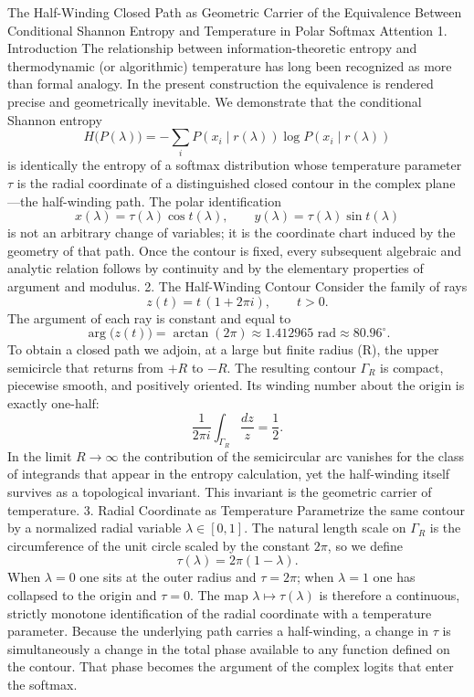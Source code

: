 The Half-Winding Closed Path as Geometric Carrier of the Equivalence Between Conditional Shannon Entropy and Temperature in Polar Softmax Attention
1. Introduction
The relationship between information-theoretic entropy and thermodynamic (or algorithmic) temperature has long been recognized as more than formal analogy. In the present construction the equivalence is rendered precise and geometrically inevitable. We demonstrate that the conditional Shannon entropy
\[
H\bigl(P(\lambda)\bigr)=-\sum_i P(x_i\mid r(\lambda))\log P(x_i\mid r(\lambda))
\]
is identically the entropy of a softmax distribution whose temperature parameter \(\tau\) is the radial coordinate of a distinguished closed contour in the complex plane—the half-winding path. The polar identification
\[
x(\lambda)=\tau(\lambda)\cos t(\lambda),\qquad y(\lambda)=\tau(\lambda)\sin t(\lambda)
\]
is not an arbitrary change of variables; it is the coordinate chart induced by the geometry of that path. Once the contour is fixed, every subsequent algebraic and analytic relation follows by continuity and by the elementary properties of argument and modulus.
2. The Half-Winding Contour
Consider the family of rays
\[
z(t)=t\,(1+2\pi i),\qquad t>0.
\]
The argument of each ray is constant and equal to
\[
\arg\bigl(z(t)\bigr)=\arctan(2\pi)\approx1.412965\text{ rad}\approx80.96^\circ.
\]
To obtain a closed path we adjoin, at a large but finite radius (R), the upper semicircle that returns from \(+R\) to \(-R\). The resulting contour \(\Gamma_R\) is compact, piecewise smooth, and positively oriented. Its winding number about the origin is exactly one-half:
\[
\frac{1}{2\pi i}\int_{\Gamma_R}\frac{dz}{z}=\frac12.
\]
In the limit \(R\to\infty\) the contribution of the semicircular arc vanishes for the class of integrands that appear in the entropy calculation, yet the half-winding itself survives as a topological invariant. This invariant is the geometric carrier of temperature.
3. Radial Coordinate as Temperature
Parametrize the same contour by a normalized radial variable \(\lambda\in[0,1]\). The natural length scale on \(\Gamma_R\) is the circumference of the unit circle scaled by the constant \(2\pi\), so we define
\[
\tau(\lambda)=2\pi(1-\lambda).
\]
When \(\lambda=0\) one sits at the outer radius and \(\tau=2\pi\); when \(\lambda=1\) one has collapsed to the origin and \(\tau=0\). The map \(\lambda\mapsto\tau(\lambda)\) is therefore a continuous, strictly monotone identification of the radial coordinate with a temperature parameter. Because the underlying path carries a half-winding, a change in \(\tau\) is simultaneously a change in the total phase available to any function defined on the contour. That phase becomes the argument of the complex logits that enter the softmax.
